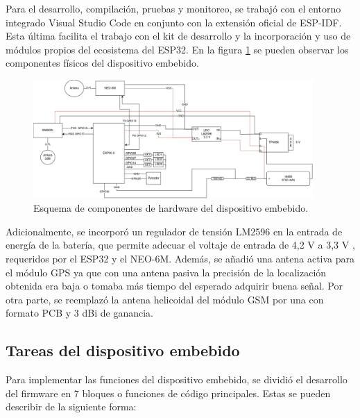 Para el desarrollo, compilación, pruebas y monitoreo, se trabajó con el entorno integrado Visual Studio Code en conjunto con la extensión oficial de ESP-IDF. Esta última facilita el trabajo con el kit de desarrollo y la incorporación y uso de módulos propios del ecosistema del ESP32. En la figura \ref{fig:esp32:diagrama} se pueden observar los componentes físicos del dispositivo embebido.


\begin{figure}[H]
	\centering
	\includegraphics[width=0.95\textwidth]{./Figures/esp32-arquitectura.png}
	\caption{Esquema de componentes de hardware del dispositivo embebido.}
	\label{fig:esp32:diagrama}
\end{figure}

\pagebreak

Adicionalmente, se incorporó un regulador de tensión LM2596 en la entrada de energía de la batería, que permite adecuar el voltaje de entrada de 4,2 V a 3,3 V \citep{LM2596:1}, requeridos por el ESP32 y el NEO-6M. Además, se añadió una antena activa para el módulo GPS ya que con una antena pasiva la precisión de la localización obtenida era baja o tomaba más tiempo del esperado adquirir buena señal. Por otra parte, se reemplazó la antena helicoidal del módulo GSM por una con formato PCB y 3 dBi de ganancia.


\subsection{Tareas del dispositivo embebido}

Para implementar las funciones del dispositivo embebido, se dividió el desarrollo del firmware en 7 bloques o funciones de código principales. Estas se pueden describir de la siguiente forma:

